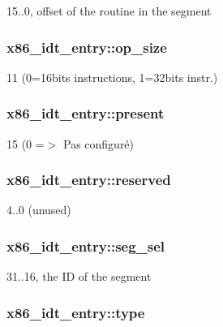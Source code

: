15..0, offset of the routine in the segment \hypertarget{structx86__idt__entry_a58f211f10555adac756847fa46a0c856}{
\subsubsection[{op\+\_\+size}]{ x86\+\_\+idt\+\_\+entry\+::op\+\_\+size}}\label{structx86__idt__entry_a58f211f10555adac756847fa46a0c856}
11 (0=16bits instructions, 1=32bits instr.) \hypertarget{structx86__idt__entry_aad5f9c737cf3c83abf7f5561acaa0891}{
\subsubsection[{present}]{ x86\+\_\+idt\+\_\+entry\+::present}}\label{structx86__idt__entry_aad5f9c737cf3c83abf7f5561acaa0891}
15 (0 =$>$ Pas configuré) \hypertarget{structx86__idt__entry_adb99b161a27397d74e715d962b1c65fa}{
\subsubsection[{reserved}]{ x86\+\_\+idt\+\_\+entry\+::reserved}}\label{structx86__idt__entry_adb99b161a27397d74e715d962b1c65fa}
4..0 (unused) \hypertarget{structx86__idt__entry_a47f891095976b78c547b428be1b91c87}{
\subsubsection[{seg\+\_\+sel}]{ x86\+\_\+idt\+\_\+entry\+::seg\+\_\+sel}}\label{structx86__idt__entry_a47f891095976b78c547b428be1b91c87}
31..16, the I\+D of the segment \hypertarget{structx86__idt__entry_a826ef1aafc2352576ec3493747b964f5}{
\subsubsection[{type}]{ x86\+\_\+idt\+\_\+entry\+::type}}\label{structx86__idt__entry_a826ef1aafc2352576ec3493747b964f5}
